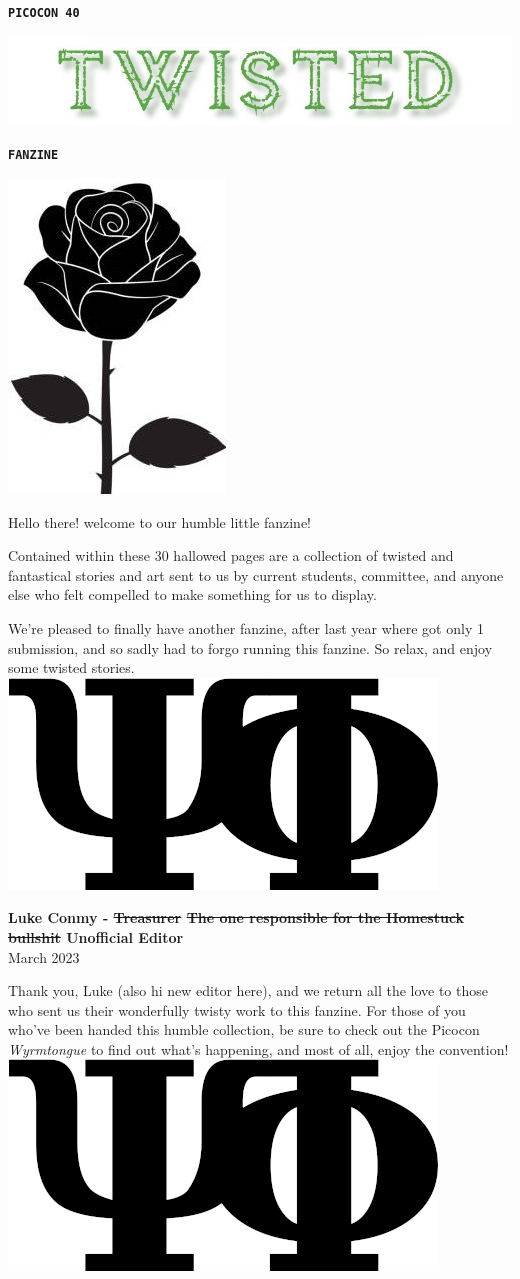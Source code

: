 \documentclass{picocon-fanzine}
\renewcommand{\tombstone}{%
  \includegraphics[height=\fontcharht\font`\B,clip]{img/tombstone}%
}
\begin{document}
\thispagestyle{empty}
\vspace*{8cm}
\begin{center}
\texttt{\textbf{\Large PICOCON 40}}
\end{center}
\begin{center}
\includegraphics[width=1\textwidth]{img/twisted-poster.jpeg}
\end{center}
\begin{center}
\texttt{\textbf{\Large FANZINE}}
\begin{center}
\includegraphics[height=0.1\textwidth]{img/black-rose.jpg}
\end{center}
\end{center}
\clearpage
\setcounter{page}{1}

Hello there! welcome to our humble little fanzine! 

Contained within these 30 hallowed pages are a collection of twisted and fantastical stories and art sent to us by current students, committee, and anyone else who felt compelled to make something for us to display.

We're pleased to finally have another fanzine, after last year where got only 1 submission, and so sadly had to forgo running this fanzine. So relax, and enjoy some twisted stories.
\tombstone

\hfill \parbox{0.5\textwidth}{{\large\textbf{\textemdash{} Luke Conmy - \st{Treasurer} \st{The one responsible for the Homestuck bullshit} Unofficial Editor}}\\\hspace*{1.7em}March 2023}
\vfill

Thank you, Luke (also hi new editor here), and we return all the love to those who sent us their wonderfully twisty work to this fanzine. For those of you who've been handed this humble collection, be sure to check out the Picocon \emph{Wyrmtongue} to find out what's happening, and most of all, enjoy the convention!
\tombstone
\end{document}
